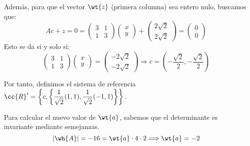 \begin{ejercicio}
\begin{enumerate}
        Además, para que el vector $\wt{z}$ (primera columna) sea entero nulo, buscamos que:
        \begin{equation*}
            Ac + z = 0
            =  \left(\begin{array}{cc}
                3 & 1 \\
                1 & 3
            \end{array}\right)\left(\begin{array}{c}
                x\\y
            \end{array}\right) + \left(\begin{array}{c}
                2\sqrt{2} \\ 2\sqrt{2}
            \end{array}\right) = \left(\begin{array}{c}
                0\\0
            \end{array}\right)
        \end{equation*}
        Esto se da si y solo si:
        \begin{equation*}
            \left(\begin{array}{cc}
                3 & 1 \\
                1 & 3
            \end{array}\right)\left(\begin{array}{c}
                x\\y
            \end{array}\right) = \left(\begin{array}{c}
                -2\sqrt{2} \\ -2\sqrt{2}
            \end{array}\right) \Longrightarrow c=\left(-\frac{\sqrt{2}}{2},-\frac{\sqrt{2}}{2}\right)
        \end{equation*}

        Por tanto, definimos el sistema de referencia $\cc{R}'=\left\{c, \left\{\dfrac{1}{\sqrt{2}}(1,1), \dfrac{1}{\sqrt{2}}(-1,1)\right\}\right\}$.

        Para calcular el nuevo valor de $\wt{a}$, sabemos que el determinante es invariante mediante semejanzas.
        \begin{equation*}
            |\wh{A}|=-16= \wt{a}\cdot 4\cdot 2\Longrightarrow \wt{a}=-2
        \end{equation*}
        

\end{enumerate}
\end{ejercicio}

